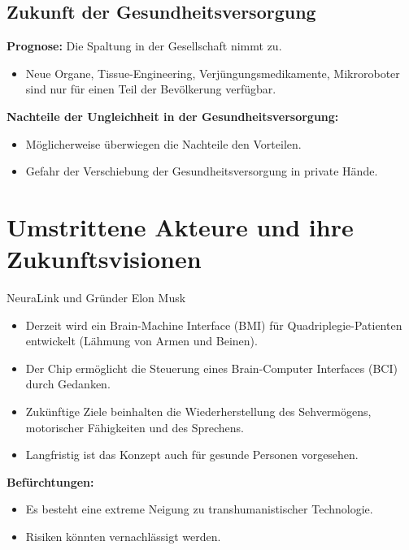 \documentclass[aspectratio=169,16pt,xcolor=table]{beamer}
\begin{document}
\begin{frame}
  \section*{Zukunft der Gesundheitsversorgung}

  \textbf{Prognose:} Die Spaltung in der Gesellschaft nimmt zu.

  \begin{itemize}
      \item Neue Organe, Tissue-Engineering, Verjüngungsmedikamente, Mikroroboter sind nur für einen Teil der Bevölkerung verfügbar.
  \end{itemize}

  \textbf{Nachteile der Ungleichheit in der Gesundheitsversorgung:}

  \begin{itemize}
      \item Möglicherweise überwiegen die Nachteile den Vorteilen.
      \item Gefahr der Verschiebung der Gesundheitsversorgung in private Hände.
  \end{itemize}
\end{frame}

\section*{Umstrittene Akteure und ihre Zukunftsvisionen}
\begin{frame}
  NeuraLink und Gründer Elon Musk
  \begin{itemize}
      \item Derzeit wird ein Brain-Machine Interface (BMI) für Quadriplegie-Patienten entwickelt (Lähmung von Armen und Beinen).
      \item Der Chip ermöglicht die Steuerung eines Brain-Computer Interfaces (BCI) durch Gedanken.
      \item Zukünftige Ziele beinhalten die Wiederherstellung des Sehvermögens, motorischer Fähigkeiten und des Sprechens.
      \item Langfristig ist das Konzept auch für gesunde Personen vorgesehen.
  \end{itemize}
  
  \textbf{Befürchtungen:}

  \begin{itemize}
      \item Es besteht eine extreme Neigung zu transhumanistischer Technologie.
      \item Risiken könnten vernachlässigt werden.
  \end{itemize}
\end{frame}
\end{document}

